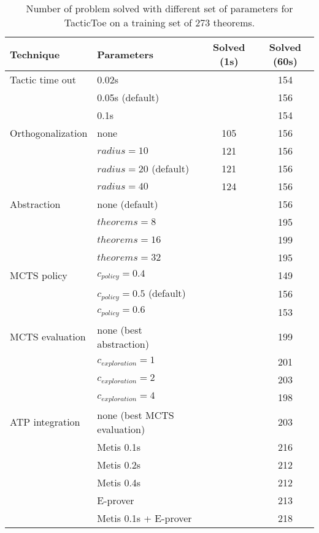 \documentclass[runningheads,a4paper,draft]{svjour3}
\def\eprover{\textsf{E-prover}\xspace}
\def\metis{\textsf{Metis}\xspace}
\def\tactictoe{\textsf{TacticToe}\xspace}
\newcommand{\ra}[1]{\renewcommand{\arraystretch}{#1}}
\begin{document}
\begin{table}[ht]
\centering\ra{1.3}
\small
\begin{tabular}{llcc}
\toprule
 Technique & Parameters & Solved (1s) & Solved (60s)\\
\midrule
Tactic time out & 0.02s && 154\\
                & 0.05s (default) && 156\\
                & 0.1s && 154\\
\midrule
Orthogonalization & none & 105 & 156 \\
                  & $radius = 10$ & 121 & 156 \\
                  & $radius = 20$ (default) & 121 & 156 \\ 
                  & $radius = 40$ & 124 & 156 \\
\midrule
Abstraction       & none (default)  && 156\\ 
                  & $theorems = 8$  && 195\\
                  & $theorems = 16$ && 199\\
                  & $theorems = 32$ && 195\\
\midrule
MCTS policy & $c_{policy} = 0.4$ && 149\\
            & $c_{policy} = 0.5$ (default) && 156\\
            & $c_{policy} = 0.6$ && 153\\
\midrule
MCTS evaluation & none (best abstraction) && 199\\
				& $c_{exploration} = 1$ && 201\\ 
				& $c_{exploration} = 2$ && 203\\ 
				& $c_{exploration} = 4$ && 198\\
\midrule
ATP integration & none (best MCTS evaluation) && 203\\
                & \metis 0.1s && 216\\
                & \metis 0.2s && 212\\
                & \metis 0.4s && 212\\ 
                & \eprover && 213\\
                & \metis 0.1s + \eprover && 218\\
\bottomrule
\end{tabular}
\caption{\label{tab:tuning} Number of problem solved with different set of 
parameters for \tactictoe on a training set of 273 theorems.} 
\end{table}
\end{document}
